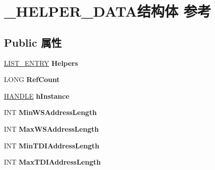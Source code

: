 \hypertarget{struct___h_e_l_p_e_r___d_a_t_a}{}\section{\+\_\+\+H\+E\+L\+P\+E\+R\+\_\+\+D\+A\+T\+A结构体 参考}
\label{struct___h_e_l_p_e_r___d_a_t_a}
\subsection*{Public 属性}
\begin{DoxyCompactItemize}
\item 
\mbox{\label{struct___h_e_l_p_e_r___d_a_t_a_ad43710e03ae8cdb1cca56697c8a081cd}} 
\hyperlink{struct___l_i_s_t___e_n_t_r_y}{L\+I\+S\+T\+\_\+\+E\+N\+T\+RY} {\bfseries Helpers}
\item 
\mbox{\label{struct___h_e_l_p_e_r___d_a_t_a_abe0fa5732219c71f0d49535e05d32fde}} 
L\+O\+NG {\bfseries Ref\+Count}
\item 
\mbox{\label{struct___h_e_l_p_e_r___d_a_t_a_a30eba11471d3b9662c0a2d8277a6ece4}} 
\hyperlink{interfacevoid}{H\+A\+N\+D\+LE} {\bfseries h\+Instance}
\item 
\mbox{\label{struct___h_e_l_p_e_r___d_a_t_a_a61a591eaa26ddbe6b503626134ed2d50}} 
I\+NT {\bfseries Min\+W\+S\+Address\+Length}
\item 
\mbox{\label{struct___h_e_l_p_e_r___d_a_t_a_a9373a73728f730751d9a4df5494a8a5d}} 
I\+NT {\bfseries Max\+W\+S\+Address\+Length}
\item 
\mbox{\label{struct___h_e_l_p_e_r___d_a_t_a_ab804328f7e84a755243387bafd147d99}} 
I\+NT {\bfseries Min\+T\+D\+I\+Address\+Length}
\item 
\mbox{\label{struct___h_e_l_p_e_r___d_a_t_a_a0286be3819ec7e90c95689525e98d277}} 
I\+NT {\bfseries Max\+T\+D\+I\+Address\+Length}
\item 
\mbox{\label{struct___h_e_l_p_e_r___d_a_t_a_a00e5d208375cd21682bf708d69e720cf}} 

\end{DoxyCompactItemize}
